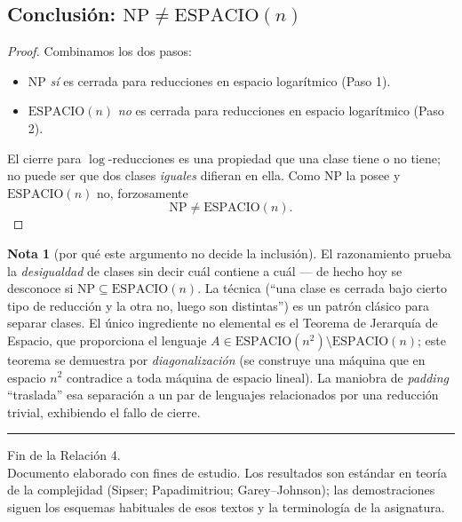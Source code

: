 \documentclass[11pt,a4paper]{article}
\theoremstyle{plain}
\theoremstyle{definition}
\newtheorem*{nota}{Nota}
\newcommand{\NP}{\mathrm{NP}}
\newcommand{\SPACE}{\mathrm{ESPACIO}}
\begin{document}
\subsection*{Conclusi\'on: $\NP\neq\SPACE(n)$}

\begin{proof}
Combinamos los dos pasos:
\begin{itemize}[nosep]
  \item $\NP$ \emph{s\'i} es cerrada para reducciones en espacio logar\'itmico
        (Paso 1).
  \item $\SPACE(n)$ \emph{no} es cerrada para reducciones en espacio logar\'itmico
        (Paso 2).
\end{itemize}
El cierre para $\log$-reducciones es una propiedad que una clase tiene o no tiene; no
puede ser que dos clases \emph{iguales} difieran en ella. Como $\NP$ la posee y
$\SPACE(n)$ no, forzosamente
\[
\boxed{\ \NP\neq\SPACE(n).\ }
\]
\end{proof}

\begin{nota}[por qu\'e este argumento no decide la inclusi\'on]
El razonamiento prueba la \emph{desigualdad} de clases sin decir cu\'al contiene a
cu\'al --- de hecho hoy se desconoce si $\NP\subseteq\SPACE(n)$. La t\'ecnica
(``una clase es cerrada bajo cierto tipo de reducci\'on y la otra no, luego son
distintas'') es un patr\'on cl\'asico para separar clases. El \'unico ingrediente no
elemental es el Teorema de Jerarqu\'ia de Espacio, que proporciona el lenguaje
$A\in\SPACE(n^2)\setminus\SPACE(n)$; este teorema se demuestra por
\emph{diagonalizaci\'on} (se construye una m\'aquina que en espacio $n^2$ contradice a
toda m\'aquina de espacio lineal). La maniobra de \emph{padding} ``traslada'' esa
separaci\'on a un par de lenguajes relacionados por una reducci\'on trivial,
exhibiendo el fallo de cierre.
\end{nota}

\vspace{6mm}
\hrule
\vspace{3mm}
\begin{center}\small
Fin de la Relaci\'on 4.\\[1mm]
Documento elaborado con fines de estudio. Los resultados son est\'andar en teor\'ia
de la complejidad (Sipser; Papadimitriou; Garey--Johnson); las demostraciones siguen
los esquemas habituales de esos textos y la terminolog\'ia de la asignatura.
\end{center}
\end{document}
